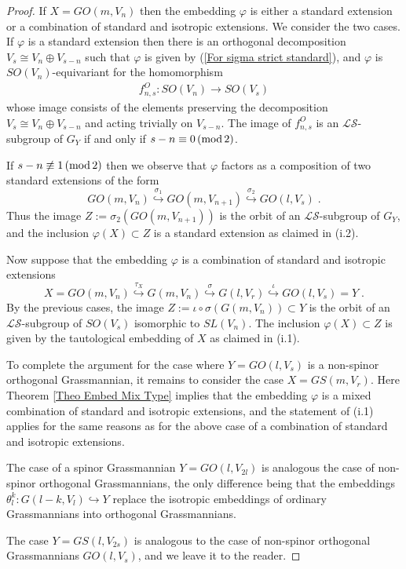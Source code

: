 \documentclass[12pt]{amsart}
\def\hw  {\hookrightarrow}
\def\mc {\mathcal}
\begin{document}
\begin{proof}
If $X= GO(m,V_n)$ then the embedding $\varphi$ is either a standard extension or a combination of standard and isotropic extensions. We consider the two cases. If $\varphi$ is a standard extension then there is an orthogonal decomposition $V_s\cong V_n\oplus V_{s-n}$ such that $\varphi$ is given by (\ref{For sigma strict standard}), and $\varphi$ is $SO(V_n)$-equivariant for the homomorphism 
\begin{gather}\label{For fnsO}
f^O_{n,s}:SO(V_n)\to SO(V_s)
\end{gather}
whose image consists of the elements preserving the decomposition $V_s\cong V_n\oplus V_{s-n}$ and acting trivially on $V_{s-n}$. The image of $f^O_{n,s}$ is an $\mc{LS}$-subgroup of $G_Y$ if and only if $s-n\equiv 0\,({\rm mod}\, 2)$.

If $s-n\not\equiv 1\,({\rm mod}\, 2)$ then we observe that $\varphi$ factors as a composition of two standard extensions of the form
$$
GO(m,V_n) \stackrel{\sigma_1}{\hw} GO(m,V_{n+1}) \stackrel{\sigma_2}{\hw} GO(l,V_s)  \;.
$$
Thus the image $Z:=\sigma_2(GO(m,V_{n+1}))$ is the orbit of an $\mc{LS}$-subgroup of $G_Y$, and the inclusion $\varphi(X)\subset Z$ is a standard extension as claimed in (i.2).

Now suppose that the embedding $\varphi$ is a combination of standard and isotropic extensions 
$$
X=GO(m,V_n) \stackrel{\tau_X}{\hw} G(m,V_{n}) \stackrel{\sigma}{\hw} G(l,V_r) \stackrel{\iota}{\hw} GO(l,V_s)=Y\;.
$$
By the previous cases, the image $Z:=\iota\circ\sigma(G(m,V_{n}))\subset Y$ is the orbit of an $\mc{LS}$-subgroup of $SO(V_s)$ isomorphic to $SL(V_n)$. The inclusion $\varphi(X)\subset Z$ is given by the tautological embedding of $X$ as claimed in (i.1).

To complete the argument for the case where $Y= GO(l,V_s)$ is a non-spinor orthogonal Grassmannian, it remains to consider the case $X= GS(m,V_r)$. Here Theorem \ref{Theo Embed Mix Type} implies that the embedding $\varphi$ is a mixed combination of standard and isotropic extensions, and the statement of (i.1) applies for the same reasons as for the above case of a combination of standard and isotropic extensions.

The case of a spinor Grassmannian $Y=GO(l,V_{2l})$ is analogous the case of non-spinor orthogonal Grassmannians, the only difference being that the embeddings $\theta_l^k:G(l-k,V_l)\hw Y$ replace the isotropic embeddings of ordinary Grassmannians into orthogonal Grassmannians.

The case $Y= GS(l,V_{2s})$ is analogous to the case of non-spinor orthogonal Grassmannians $GO(l,V_s)$, and we leave it to the reader.



\end{proof}
\end{document}

